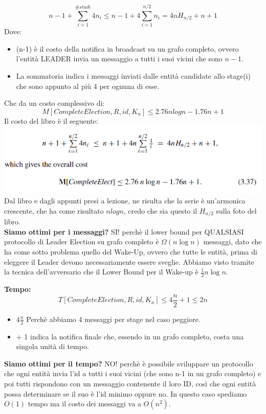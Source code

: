 $$ n-1 + \sum_{i=1}^{\#stadi} 4 n_i \leq n-1 + 4 \sum_{i=1}^{n/2} n_i = 4 n H_{n/2} + n + 1$$
Dove:
\begin{itemize}
    \item (n-1) è il costo della notifica in broadcast su un grafo completo, ovvero l'entità LEADER invia un messaggio a tutti i suoi vicini che sono $n-1$.
    \item La sommatoria indica i messaggi inviati dalle entità candidate allo stage(i) che sono appunto al più 4 per ognuna di esse.
    
\end{itemize}

Che da un costo complessivo di:
$$M[CompleteElection, R, id, K_n] \leq 2.76 n log n - 1.76 n + 1$$
Il costo del libro è il seguente:\\
\includegraphics[]{images/fff.png}
Dal libro e dagli appunti presi a lezione, ne risulta che la serie è un'armonica crescente, che ha come risultato $nlogn$, credo che sia questo il $H_{n/2}$ sulla foto del libro.\\


\textbf{Siamo ottimi per i messaggi?}
SI! perchè il lower bound per QUALSIASI protocollo di Leader Election su grafo completo è $\Omega(n \log n)$ messaggi, dato che ha come sotto problema quello del Wake-Up, ovvero che tutte le entità, prima di eleggere il Leader devono necessariamente essere sveglie. Abbiamo visto tramite la tecnica dell'avversario che il Lower Bound per il Wake-up è $\frac{1}{2}n \log n$.


\textbf{Tempo:}\\ $$T[CompleteElection, R, id, K_n] \leq 4 \frac{n}{2} + 1 \leq 2 n$$
\begin{itemize}
    \item $ 4 \frac{n}{2} $ Perchè abbiamo 4 messaggi per stage nel caso peggiore.
    \item + 1 indica la notifica finale che, essendo in un grafo completo, costa una singola unità di tempo.
\end{itemize}

\textbf{Siamo ottimi per il tempo?} NO! perchè è possibile sviluppare un protocollo che ogni entità invia l'id a tutti i suoi vicini (che sono n-1 in un grafo completo) e poi tutti rispondono con un messaggio contenente il loro ID, così che ogni entità possa determinare se il suo è l'id minimo oppure no. In questo caso spediamo $O(1)$ tempo ma il costo dei messaggi va a $O(n^2)$.

